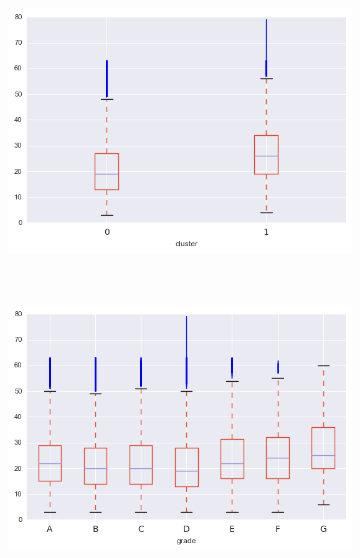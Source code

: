 \begin{apendicesenv}
\begin{figure}[t!]
\begin{subfigure}[t]{0.5\textwidth}
			\centerline{\includegraphics[width=1.05\textwidth]{img/total_acc_by_cluster}}
    	\end{subfigure}%
    	~ 
    	\begin{subfigure}[t]{0.5\textwidth}
    		\centering
   
			\centerline{\includegraphics[width=1.05\textwidth]{img/total_acc_by_grade}}

    	\end{subfigure}
\\
    	        \caption{out\textunderscore prncp}
    	\begin{subfigure}[t]{0.5\textwidth}
    		\centering


\end{subfigure}
\end{figure}
\end{apendicesenv}
